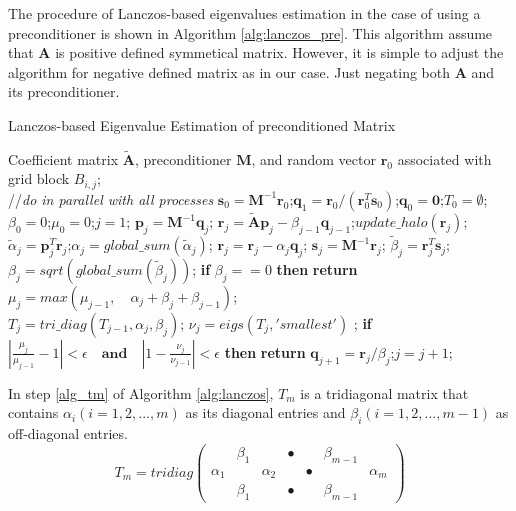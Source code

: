 \documentclass{sig-alternate}
\begin{document}
The procedure of Lanczos-based eigenvalues estimation in the case of using a preconditioner is shown in Algorithm \ref{alg:lanczos_pre}. This algorithm assume that $\textbf{A}$ is positive defined symmetical matrix.  However, it is simple to adjust the algorithm for negative defined matrix as in our case. Just negating both $\textbf{A}$ and its preconditioner. 
\begin{algorithm}
\caption{Lanczos-based Eigenvalue Estimation of preconditioned Matrix}
\label{alg:lanczos_pre}
\begin{algorithmic}[1]
\REQUIRE Coefficient matrix $\tilde{\textbf{A}}$, preconditioner $\textbf{M}$, and random vector $\textbf{r}_0$ associated with grid block $B_{i,j}$; \\
 //\qquad    \textit{do in parallel with all processes}
\STATE $\textbf{s}_0=\textbf{M}^{-1}\textbf{r}_0$;\quad $\textbf{q}_1 = \textbf{r}_0/({\textbf{r}_0^T\textbf{s}_0})$;\quad $\textbf{q}_0=\textbf{0}$;\quad $T_0=\emptyset$;\quad $\beta_0 =0$;\quad  $\mu_0 =0$;\quad $j=1$;
\STATE $\textbf{p}_j = \textbf{M}^{-1}\textbf{q}_j$;
\STATE $\textbf{r}_j=\tilde{\textbf{A}}\textbf{p}_j-\beta_{j-1}\textbf{q}_{j-1}$;\quad $update\_halo(\textbf{r}_j)$;
\STATE $\tilde{\alpha}_j =\textbf{p}_j^T\textbf{r}_j$;\quad $\alpha_j=global\_sum(\tilde{\alpha}_j)$;
\STATE $\textbf{r}_j=\textbf{r}_j-\alpha_{j}\textbf{q}_{j}$;
\STATE $\textbf{s}_j = \textbf{M}^{-1}\textbf{r}_j$; 
\STATE $\tilde{\beta}_j = \textbf{r}_j^T\textbf{s}_j$; \quad $\beta_j=sqrt(global\_sum(\tilde{\beta}_j))$;
\STATE \textbf{if} $\beta_j == 0$ \textbf{then} \textbf{return}
\STATE $\mu_j = max(\mu_{j-1}, \quad \alpha_j+\beta_j+\beta_{j-1})$; \label{lan_gersh}\\
\STATE $T_j=tri\_diag(T_{j-1},\alpha_j,\beta_j)$; \quad $\nu_j = eigs(T_j,'smallest')$ ; \label{lan_tm}
\STATE \textbf{if} $|\frac{\mu_j}{\mu_{j-1}} -1 |< \epsilon\quad\textbf{and}\quad|1- \frac{\nu_j}{\nu_{j-1}}|< \epsilon$ \textbf{then} \textbf{return}
\STATE $\textbf{q}_{j+1}= \textbf{r}_j/\beta_j$;\quad $j=j+1$;
\ENDWHILE
\end{algorithmic}
\end{algorithm}

In step \ref{alg_tm} of Algorithm \ref{alg:lanczos}, $T_m$ is a tridiagonal matrix that contains $\alpha_i (i=1,2,...,m)$ as its diagonal entries and $\beta_i (i=1,2,...,m-1)$ as off-diagonal entries.
\[ T_{m} = tridiag\left(\begin{array}{ccccccc}
&\beta_1 && \bullet & &\beta_{m-1}&    \\
\alpha_1 & &\alpha_2 && \bullet &&\alpha_{m}\\
&\beta_1 && \bullet & & \beta_{m-1}&
\end{array} \right)\]
\end{document}
